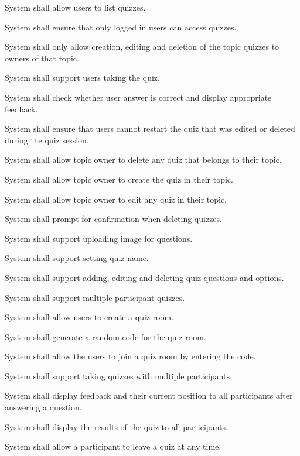 \begin{frlist}
    \item System shall allow users to list quizzes.
    \item System shall ensure that only logged in users can access quizzes.
    \item System shall only allow creation, editing and deletion of the topic quizzes to owners of that topic.
    \item System shall support users taking the quiz.
    \item System shall check whether user answer is correct and display appropriate feedback.
    \item System shall ensure that users cannot restart the quiz that was edited or deleted during the quiz session.
    \item System shall allow topic owner to delete any quiz that belongs to their topic.
    \item System shall allow topic owner to create the quiz in their topic.
    \item System shall allow topic owner to edit any quiz in their topic.
    \item System shall prompt for confirmation when deleting quizzes.
    \item System shall support uploading image for questions.
    \item System shall support setting quiz name.
    \item System shall support adding, editing and deleting quiz questions and options.
    \item System shall support multiple participant quizzes.
    \item System shall allow users to create a quiz room.
    \item System shall generate a random code for the quiz room.
    \item System shall allow the users to join a quiz room by entering the code.
    \item System shall support taking quizzes with multiple participants.
    \item System shall display feedback and their current position to all participants after answering a question.
    \item System shall display the results of the quiz to all participants.
    \item System shall allow a participant to leave a quiz at any time.
\end{frlist}


